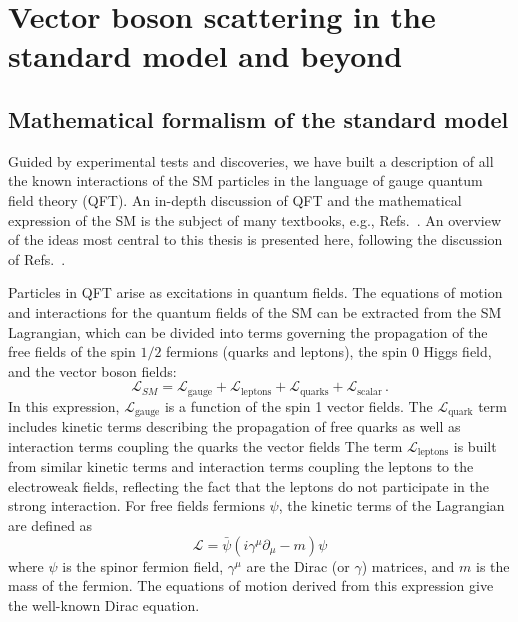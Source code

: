 \chapter{Vector boson scattering in the standard model and beyond}
\label{ch:phenomenology}

\section{Mathematical formalism of the standard model}
\label{sec:formalism}

Guided by experimental tests and
discoveries, we have built a description of all the known interactions 
of the SM particles in the language of gauge quantum field theory (QFT).
An in-depth discussion of QFT and the mathematical expression of the SM is
the subject of many textbooks, e.g., 
Refs.~\cite{Aitchison:2003tq,Srednicki:2007qs,Peskin:1995ev,Halzen:1984mc,Barger:1987nn}. 
An overview of the ideas
most central to this thesis is presented here, following the discussion
of Refs.~\cite{Quigg:2009vq,Peskin:1995ev}.

Particles in QFT arise as excitations in quantum fields.
The equations of motion and interactions for the quantum fields of the SM can
be extracted from the SM Lagrangian, which can be divided into 
terms governing the propagation of the free fields of the spin $1/2$ 
fermions (quarks and leptons), the spin 0 Higgs field, and the vector boson fields:
\begin{equation}
  \mathcal{L}_{SM} = \mathcal{L}_{\text{gauge}} + \mathcal{L}_{\text{leptons}} + 
      \mathcal{L}_{\text{quarks}} + \mathcal{L}_{\text{scalar}} \,.
  \label{eq:smlagrangian}
\end{equation}
In this expression, $\mathcal{L}_{\text{gauge}}$ is a function of the 
spin 1 vector fields.
The $\mathcal{L}_{\text{quark}}$ term includes kinetic terms describing the 
propagation of free quarks as well as interaction terms coupling the quarks
the vector fields
The term $\mathcal{L}_{\text{leptons}}$ is built from similar kinetic terms and 
interaction terms coupling the leptons to the electroweak fields, reflecting
the fact that the leptons do not participate in the strong interaction.
For free fields fermions $\psi$, the kinetic terms of the Lagrangian are defined as
\begin{equation}
  \mathcal{L} = \bar{\psi}(i\gamma^{\mu}\partial_\mu - m)\psi
  \label{eq:freeFermion}
\end{equation}
where $\psi$ is the spinor fermion field, $\gamma^{\mu}$ are the 
Dirac (or $\gamma$) matrices, and $m$ is the mass of the fermion. 
The equations of motion derived from this expression give the well-known
Dirac equation.

